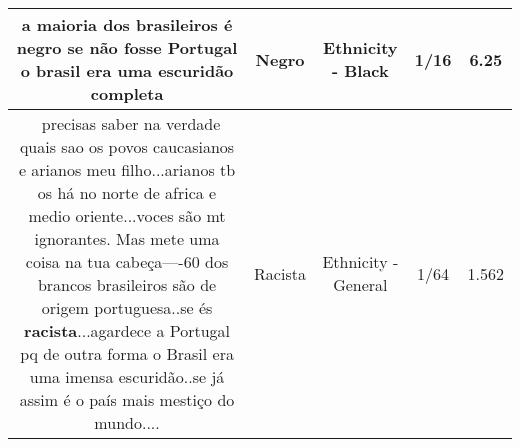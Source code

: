 \documentclass[11pt]{article}
\newlength\mylength
\begin{document}
\begin{center}
\begin{longtable}{|C{.65\mylength}|C{.30\mylength}|C{.12\mylength}|C{.12\mylength}|C{.12\mylength}|}
  \small a maioria dos brasileiros é \textbf{negro} se não fosse Portugal o brasil era uma escuridão completa\normalsize   & Negro & Ethnicity - Black & 1/16 & 6.25 \\  \hline
  \small {} precisas saber na verdade quais sao os povos caucasianos e arianos meu filho...arianos tb os há no norte de africa e medio oriente...voces são mt ignorantes. Mas mete uma coisa na tua cabeça----60 dos brancos brasileiros são de origem portuguesa..se és \textbf{racista}...agardece a Portugal pq de outra forma o Brasil era uma imensa escuridão..se já assim é o país mais mestiço do mundo....\normalsize   & Racista & Ethnicity - General & 1/64 & 1.562 \\  \hline

\end{longtable}
\end{center}
\end{document}
